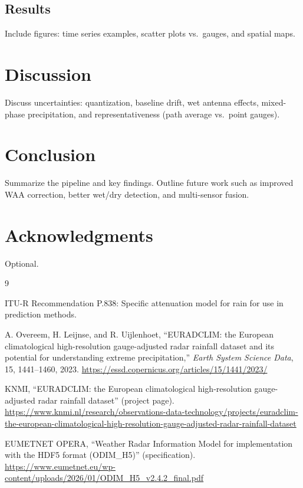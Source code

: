 \documentclass[11pt]{article}
\begin{document}
\subsection{Results}
Include figures: time series examples, scatter plots vs.\ gauges, and spatial maps.

\section{Discussion}
Discuss uncertainties: quantization, baseline drift, wet antenna effects, mixed-phase precipitation, and representativeness (path average vs.\ point gauges).

\section{Conclusion}
Summarize the pipeline and key findings. Outline future work such as improved WAA correction, better wet/dry detection, and multi-sensor fusion.

\section*{Acknowledgments}
Optional.


\begin{thebibliography}{9}

ITU-R Recommendation P.838: Specific attenuation model for rain for use in prediction methods.

A. Overeem, H. Leijnse, and R. Uijlenhoet, ``EURADCLIM: the European climatological high-resolution gauge-adjusted radar rainfall dataset and its potential for understanding extreme precipitation,'' \emph{Earth System Science Data}, 15, 1441--1460, 2023. \url{https://essd.copernicus.org/articles/15/1441/2023/}

KNMI, ``EURADCLIM: the European climatological high-resolution gauge-adjusted radar rainfall dataset'' (project page). \url{https://www.knmi.nl/research/observations-data-technology/projects/euradclim-the-european-climatological-high-resolution-gauge-adjusted-radar-rainfall-dataset}

EUMETNET OPERA, ``Weather Radar Information Model for implementation with the HDF5 format (ODIM\_H5)'' (specification). \url{https://www.eumetnet.eu/wp-content/uploads/2026/01/ODIM_H5_v2.4.2_final.pdf}

\end{thebibliography}
\end{document}
